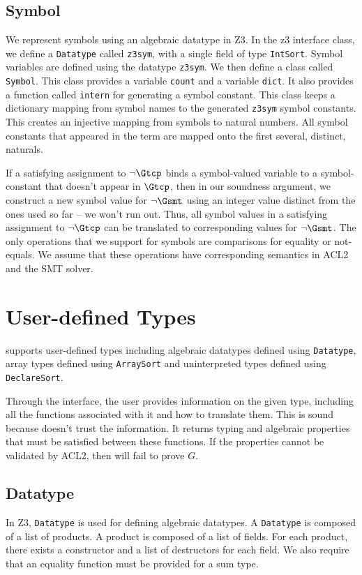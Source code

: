 \subsection{Symbol}\label{subsec:symbols}
We represent symbols using an algebraic datatype in Z3. In the z3 interface
class, we define a \texttt{Datatype} called \texttt{z3sym}, with a single field
of type \texttt{IntSort}. Symbol variables are defined using the datatype
\texttt{z3sym}. We then define a class called \texttt{Symbol}. This class
provides a variable \texttt{count} and a variable \texttt{dict}. It also
provides a function called \texttt{intern} for generating a symbol constant.
This class keeps a dictionary mapping from symbol names to the generated
\texttt{z3sym} symbol constants. This creates an injective mapping from symbols
to natural numbers.
All symbol constants that appeared in the term are mapped onto the first
several, distinct, naturals.

If a satisfying assignment to $\neg \Gtcp$ binds a symbol-valued variable
to a symbol-constant that doesn't appear in $\Gtcp$, then in our soundness
argument, we construct a new symbol value for $\neg \Gsmt$ using an integer
value distinct from the ones used so far -- we won't run out.
Thus, all symbol values in a satisfying assignment to $\neg \Gtcp$
can be translated to corresponding values for $\neg \Gsmt$.
The only operations that we support for symbols are comparisons for equality or
not-equals.  We assume that these operations have corresponding semantics in
ACL2 and the \acs{SMT} solver.

\section{User-defined Types}\label{sec:sounduserdefined}
\smtlink{} supports user-defined types including algebraic datatypes defined
using \texttt{Datatype}, array types defined using \texttt{ArraySort} and
uninterpreted types defined using \texttt{DeclareSort}.

Through the \smtlink{} interface, the user provides information on the given
type, including all the functions associated with it and how to translate them.
This is sound because \smtlink{} doesn't trust the information. It returns
typing and algebraic properties that must be satisfied between these functions.
If the properties cannot be validated by ACL2, then \smtlink{} will fail to
prove $G$.

\subsection{Datatype}\label{subsec:sounddatatype}
In Z3, \texttt{Datatype} is used for defining algebraic datatypes.
A \texttt{Datatype} is composed of a list of products. A product is composed of
a list of fields. For each product, there exists a constructor and a list of
destructors for each field. We also require that an equality function must be
provided for a sum type.

